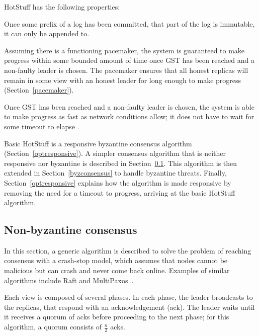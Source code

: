 HotStuff has the following properties:

\begin{property}[Safety] \label{safetyproperty}
	Once some prefix of a log has been committed, that part of the log is immutable, it can only be appended to.
\end{property}

\begin{property}[Liveness] \label{livenessproperty}
	Assuming there is a functioning pacemaker, the system is guaranteed to make progress within some bounded amount of time once GST has been reached and a non-faulty leader is chosen. The pacemaker ensures that all honest replicas will remain in some view with an honest leader for long enough to make progress (Section~\ref{pacemaker}).
\end{property}

\begin{property} \label{optresponsiveproperty}
	Once GST has been reached and a non-faulty leader is chosen, the system is able to make progress as fast as network conditions allow; it does not have to wait for some timeout to elapse \cite{passThunderellaBlockchainsOptimistic2018}.
\end{property}

Basic HotStuff is a responsive byzantine consensus algorithm (Section~\ref{optresponsive}). A simpler consensus algorithm that is neither responsive nor byzantine is described in Section~\ref{nonbyzconsensus}. This algorithm is then extended in Section~\ref{byzconsensus} to handle byzantine threats. Finally, Section~\ref{optresponsive} explains how the algorithm is made responsive by removing the need for a timeout to progress, arriving at the basic HotStuff algorithm.

\subsection{Non-byzantine consensus} \label{nonbyzconsensus}
In this section, a generic algorithm is described to solve the problem of reaching consensus with a crash-stop model, which assumes that nodes cannot be malicious but can crash and never come back online. Examples of similar algorithms include Raft \cite{ongaroSearchUnderstandableConsensus2014} and \mbox{MultiPaxos \cite{lamportParttimeParliament1998, lamportPaxosMadeSimple2001}}.

Each view is composed of several phases. In each phase, the leader broadcasts to the replicas, that respond with an acknowledgement (ack). The leader waits until it receives a quorum of acks before proceeding to the next phase; for this algorithm, a quorum consists of $\frac{n}{2}$ acks.

